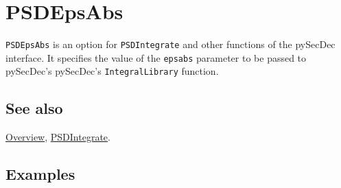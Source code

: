 \documentclass[../FeynHelpersManual.tex]{subfiles}
\begin{document}
\hypertarget{psdepsabs}{
\section{PSDEpsAbs}\label{psdepsabs}}

\texttt{PSDEpsAbs} is an option for \texttt{PSDIntegrate} and other
functions of the pySecDec interface. It specifies the value of the
\texttt{epsabs} parameter to be passed to pySecDec's pySecDec's
\texttt{IntegralLibrary} function.

\subsection{See also}

\hyperlink{toc}{Overview}, \hyperlink{psdintegrate}{PSDIntegrate}.

\subsection{Examples}
\end{document}
